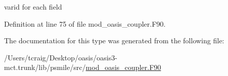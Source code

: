 varid for each field 



Definition at line 75 of file mod\+\_\+oasis\+\_\+coupler.\+F90.



The documentation for this type was generated from the following file\+:\begin{DoxyCompactItemize}
\item 
/\+Users/tcraig/\+Desktop/oasis/oasis3-\/mct.\+trunk/lib/psmile/src/\hyperlink{mod__oasis__coupler_8_f90}{mod\+\_\+oasis\+\_\+coupler.\+F90}\end{DoxyCompactItemize}

